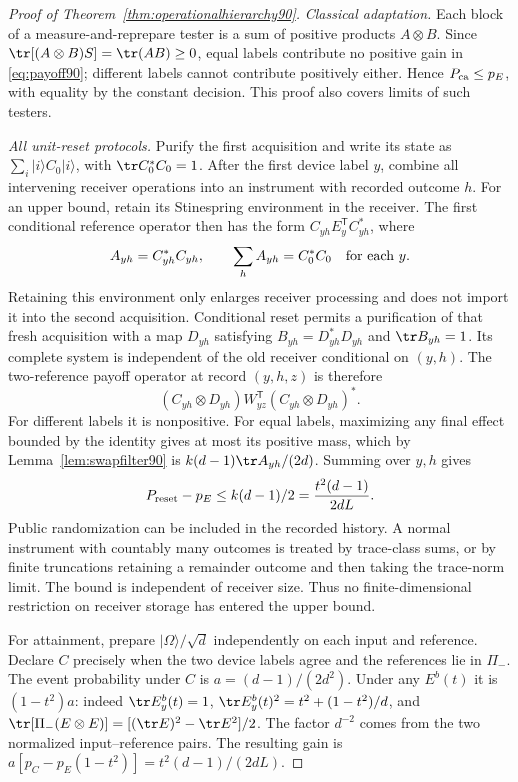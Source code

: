 \begin{proof}[Proof of Theorem~\ref{thm:operationalhierarchy90}]
\emph{Classical adaptation.}
Each block of a measure-and-reprepare tester is a sum of positive
products $A\otimes B$.  Since
$\tr[(A\otimes B)S]=\tr(AB)\ge0$, equal labels contribute no positive
gain in \eqref{eq:payoff90}; different labels cannot contribute positively
either.  Hence $P_{\rm ca}\le p_E$, with equality by the constant decision.
This proof also covers limits of such testers.

\emph{All unit-reset protocols.}
Purify the first acquisition and write its state as
$\sum_i|i\rangle C_0|i\rangle$, with $\tr C_0^*C_0=1$.
After the first device label $y$, combine all intervening receiver
operations into an instrument with recorded outcome $h$.  For an upper
bound, retain its Stinespring environment in the receiver.  The first
conditional reference operator then has the form
$C_{yh}E_y^{\mathsf T}C_{yh}^*$, where
\[
 A_{yh}=C_{yh}^*C_{yh},\qquad
 \sum_h A_{yh}=C_0^*C_0\quad\hbox{for each }y.
\]
Retaining this environment only enlarges receiver processing and does
not import it into the second acquisition.  Conditional reset permits
a purification of that fresh acquisition with a map $D_{yh}$ satisfying
$B_{yh}=D_{yh}^*D_{yh}$ and $\tr B_{yh}=1$.
Its complete system is independent of the old receiver conditional on
$(y,h)$.  The two-reference payoff operator at record $(y,h,z)$ is
therefore
\[
 (C_{yh}\otimes D_{yh})W_{yz}^{\mathsf T}
                         (C_{yh}\otimes D_{yh})^*.
\]
For different labels it is nonpositive.  For equal labels, maximizing
any final effect bounded by the identity gives at most its positive
mass, which by Lemma~\ref{lem:swapfilter90} is
$k(d-1)\tr A_{yh}/(2d)$.  Summing over $y,h$ gives
\[
 P_{\rm reset}-p_E\le k(d-1)/2=\frac{t^2(d-1)}{2dL}.
\]
Public randomization can be included in the recorded history.  A normal
instrument with countably many outcomes is treated by trace-class
sums, or by finite truncations retaining a remainder outcome and then
taking the trace-norm limit.  The bound is independent of receiver
size.  Thus no finite-dimensional restriction on receiver storage has
entered the upper bound.

For attainment, prepare $|\Omega\rangle/\sqrt d$ independently on each
input and reference.  Declare $C$ precisely when the two device labels
agree and the references lie in $\Pi_-$.  The event probability under
$C$ is $a=(d-1)/(2d^2)$.  Under any $E^b(t)$ it is $(1-t^2)a$:
indeed $\tr E_y^b(t)=1$, $\tr E_y^b(t)^2=t^2+(1-t^2)/d$, and
$\tr[\Pi_-(E\otimes E)]=[(\tr E)^2-\tr E^2]/2$.
The factor $d^{-2}$ comes from the two normalized input--reference
pairs.  The resulting gain is
$a[p_C-p_E(1-t^2)]=t^2(d-1)/(2dL)$.


\end{proof}
